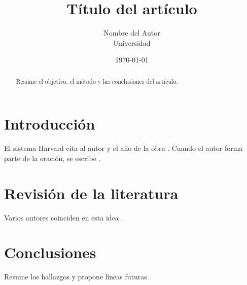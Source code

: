 \documentclass[12pt,a4paper]{article}
\title{Título del artículo}
\author{Nombre del Autor\\\small Universidad}
\date{\today}
\begin{document}
\maketitle

\begin{abstract}
Resume el objetivo, el método y las conclusiones del artículo.
\end{abstract}

\section{Introducción}
El sistema Harvard cita al autor y el año de la obra \parencite{lamport1994}. Cuando el
autor forma parte de la oración, se escribe \textcite{knuth1984}.

\section{Revisión de la literatura}
Varios autores coinciden en esta idea \parencite{goossens2004,lamport1994}.

\section{Conclusiones}
Resume los hallazgos y propone líneas futuras.

\printbibliography[title=Referencias]
\end{document}
